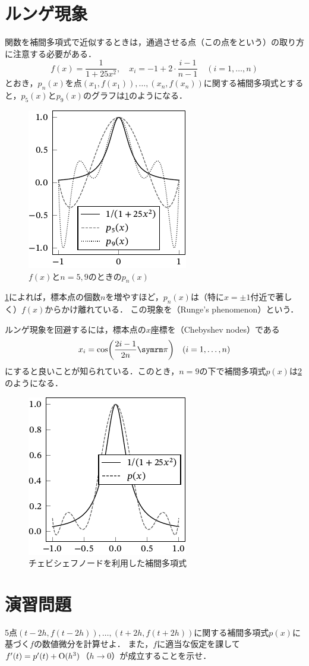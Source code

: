 \documentclass[../../main]{subfiles}
\begin{document}
\section{ルンゲ現象}
関数を補間多項式で近似するときは，通過させる点（この点をという）の取り方に注意する必要がある．
\[
  f(x) = \frac{1}{1+25x^2},
  \quad x_i = -1+2\cdot\frac{i-1}{n-1}\quad(i=1,\dots,n)
\]
とおき，\(p_n(x)\)を点\((x_1,f(x_1)),\dots,(x_n,f(x_n))\)に関する補間多項式とすると，\(p_5(x)\)と\(p_9(x)\)のグラフは\cref{figure:runge}のようになる．

\begin{figure}[htbp]
  \centering
  \includegraphics{runge.pdf}
  \caption{\(f(x)\)と\(n=5,9\)のときの\(p_n(x)\)}
  \label{figure:runge}
\end{figure}

\cref{figure:runge}によれば，標本点の個数\(n\)を増やすほど，\(p_n(x)\)は（特に\(x=\pm 1\)付近で著しく）\(f(x)\)からかけ離れている．
この現象を（Runge's phenomenon）という．

ルンゲ現象を回避するには，標本点の\(x\)座標を（Chebyshev nodes）である
\[
  x_i = \cos\pqty*{\frac{2i-1}{2n}\krez}\quad (i=1,\dots,n)
\]
にすると良いことが知られている\cite{horinouchi2015}．このとき，\(n=9\)の下で補間多項式\(p(x)\)は\cref{figure:chebyshev}のようになる．

\begin{figure}[htbp]
  \centering
  \includegraphics{chebyshev.pdf}
  \caption{チェビシェフノードを利用した補間多項式}
  \label{figure:chebyshev}
\end{figure}

\section*{演習問題}
\begin{problem}
5点\((t-2h,f(t-2h)),\dots,(t+2h,f(t+2h))\)に関する補間多項式\(p(x)\)に基づく\(f\)の数値微分を計算せよ．
また，\(f\)に適当な仮定を課して\(f'(t)=p'(t)+\operatorname{O}(h^3)\)（\(h\to 0\)）が成立することを示せ．
\end{problem}
\end{document}
